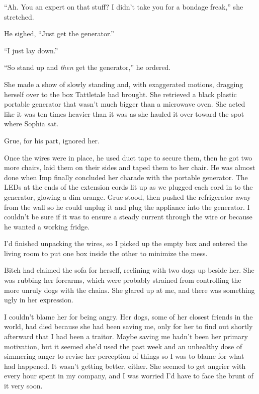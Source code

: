 ``Ah.  You an expert on that stuff?  I didn't take you for a bondage freak,'' she stretched.



He sighed, ``Just get the generator.''



``I just lay down.''



``So stand up and \emph{then} get the generator,'' he ordered.



She made a show of slowly standing and, with exaggerated motions, dragging herself over to the box Tattletale had brought.  She retrieved a black plastic portable generator that wasn't much bigger than a microwave oven.  She acted like it was ten times heavier than it was as she hauled it over toward the spot where Sophia sat.



Grue, for his part, ignored her.



Once the wires were in place, he used duct tape to secure them, then he got two more chairs, laid them on their sides and taped them to her chair.  He was almost done when Imp finally concluded her charade with the portable generator.  The LEDs at the ends of the extension cords lit up as we plugged each cord in to the generator, glowing a dim orange.  Grue stood, then pushed the refrigerator away from the wall so he could unplug it and plug the appliance into the generator.  I couldn't be sure if it was to ensure a steady current  through the wire or because he wanted a working fridge.



I'd finished unpacking the wires, so I picked up the empty box and entered the living room to put one box inside the other to minimize the mess.



Bitch had claimed the sofa for herself, reclining with two dogs up beside her.  She was rubbing her forearms, which were probably strained from controlling the more unruly dogs with the chains.  She glared up at me, and there was something ugly in her expression.



I couldn't blame her for being angry.  Her dogs, some of her closest friends in the world, had died because she had been saving me, only for her to find out shortly afterward that I had been a traitor.  Maybe saving me hadn't been her primary motivation, but it seemed she'd used the past week and an unhealthy dose of simmering anger to revise her perception of things so I was to blame for what had happened.  It wasn't getting better, either.  She seemed to get angrier with every hour spent in my company, and I was worried I'd have to face the brunt of it very soon.



